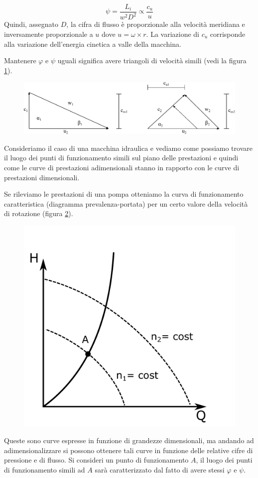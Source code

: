 \begin{equation}
\psi = \frac{L_i}{w^2 D^2} \propto \frac{c_u}{u}
\end{equation}
Quindi, assegnato $D$, la cifra di flusso è proporzionale alla velocità meridiana e inversamente proporzionale a $u$ dove $u= \omega \times r$. La variazione di $c_u$ corrisponde alla variazione dell'energia cinetica a valle della macchina. 

Mantenere $\varphi$ e $\psi$ uguali significa avere triangoli di velocità simili (vedi la figura \ref{fig:tria}).
\begin{figure}
\centering
  \includegraphics[width=.8\textwidth]{fig/triang.pdf}
\caption{}
\label{fig:tria}
\end{figure}
Consideriamo il caso di una macchina idraulica e vediamo come possiamo trovare il luogo dei punti di funzionamento simili sul piano delle prestazioni e quindi come le curve di prestazioni adimensionali stanno in rapporto con le curve di prestazioni dimensionali.

Se rileviamo le prestazioni di una pompa otteniamo la curva di funzionamento caratteristica (diagramma prevalenza-portata) per un certo valore della velocità di rotazione (figura \ref{fig:hq}).
\begin{figure}[h!]
\centering
  \includegraphics[width=.3\textwidth]{fig/hq.pdf}
\caption{}
\label{fig:hq}
\end{figure}
Queste sono curve espresse in funzione di grandezze dimensionali, ma andando ad adimensionalizzare si possono ottenere tali curve in funzione delle relative cifre di pressione e di flusso.  Si consideri un punto di funzionamento $A$, il luogo dei punti di funzionamento simili ad $A$ sarà caratterizzato dal fatto di avere stessi $\varphi$ e $\psi$.

